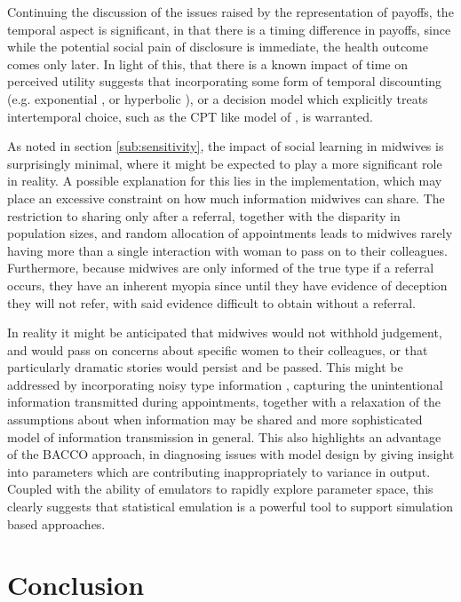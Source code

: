 Continuing the discussion of the issues raised by the representation of payoffs, the temporal aspect is significant, in that there is a timing difference in payoffs, since while the potential social pain of disclosure is immediate, the health outcome comes only later. In light of this, that there is a known impact of time on perceived utility \citet{Thaler1981} suggests that incorporating some form of temporal discounting (e.g. exponential \citep{Samuelson1937}, or hyperbolic \citep{Ainslie1991}), or a decision model which explicitly treats intertemporal choice, such as the \ac{CPT} like model of \citet{Loewenstein1992}, is warranted. 

As noted in section \ref{sub:sensitivity}, the impact of social learning in midwives is surprisingly minimal, where it might be expected to play a more significant role in reality. A possible explanation for this lies in the implementation, which may place an excessive constraint on how much information midwives can share. The restriction to sharing only after a referral, together with the disparity in population sizes, and random allocation of appointments leads to midwives rarely having more than a single interaction with woman to pass on to their colleagues. Furthermore, because midwives are only informed of the true type if a referral occurs, they have an inherent myopia since until they have evidence of deception they will not refer, with said evidence difficult to obtain without a referral.

In reality it might be anticipated that midwives would not withhold judgement, and would pass on concerns about specific women to their colleagues, or that particularly dramatic stories would persist and be passed. This might be addressed by incorporating noisy type information \citep{Feltovich2002}, capturing the unintentional information transmitted during appointments, together with a relaxation of the assumptions about when information may be shared and more sophisticated model of information transmission in general. This also highlights an advantage of the \ac{BACCO} approach, in diagnosing issues with model design by giving insight into parameters which are contributing inappropriately to variance in output. Coupled with the ability of emulators to rapidly explore parameter space, this clearly suggests that statistical emulation is a powerful tool to support simulation based approaches.

\section{Conclusion}
\label{sec:conclusion}

